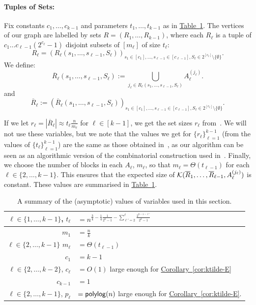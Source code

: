 \documentclass{article}
\newcommand{\cor}[1]{\hyperref[cor:#1]{Corollary~\ref*{cor:#1}}}
\newcommand{\tabl}[1]{\hyperref[tab:#1]{Table~\ref*{tab:#1}}}
\renewcommand{\>}{\rangle}
\newcommand{\<}{\langle}
\renewcommand{\(}{\left(}
\renewcommand{\)}{\right)}
\begin{document}
\paragraph{Tuples of Sets:} Fix constants $c_1,\dots,c_{k-1}$ and parameters $t_1,\dots,t_{k-1}$ as in \tabl{k-dist-setsizes}. The vertices of our graph are labelled by sets $R=(R_1,\dots,R_{k-1})$, where each $R_{\ell}$ is a tuple of $c_1\dots c_{\ell-1}(2^{c_{\ell}}-1)$ disjoint subsets of $[m_{\ell}]$ of size $t_\ell$:
$$R_{\ell}=(R_{\ell}(s_1,\dots,s_{\ell-1},S_{\ell}))_{s_1\in [c_1],\dots,s_{\ell-1}\in [c_{\ell-1}],S_{\ell}\in 2^{[c_{\ell}]}\setminus\{\emptyset\}}.$$
We define:
$$\overline{R}_{\ell}(s_1,\dots,s_{\ell-1},S_{\ell}):= 
\bigcup_{j_{\ell}\in R_{\ell}(s_1,\dots,s_{\ell-1},S_{\ell})}A_{\ell}^{(j_{\ell})}.$$
and
$$\overline{R}_{\ell}:=
(\overline{R}_{\ell}(s_1,\dots,s_{\ell-1},S_{\ell}))_{s_1\in [c_1],\dots,s_{\ell-1}\in [c_{\ell-1}],S_{\ell}\in 2^{[c_{\ell}]}\setminus\{\emptyset\}}.$$

If we let $r_{\ell}=|\overline{R}_{\ell}|\approx t_{\ell}\frac{n}{m_{\ell}}$ for $\ell\in [k-1]$, we get the set sizes $r_{\ell}$ from~\cite{belovs2012kDist}. We will not use these variables, but we note that the values we get for $\{r_{\ell}\}_{\ell=1}^{k-1}$ (from the values of $\{t_{\ell}\}_{\ell=1}^{k-1}$) are the same as those obtained in~\cite{belovs2012kDist}, as our algorithm can be seen as an algorithmic version of the combinatorial construction used in~\cite{belovs2012kDist}. Finally, we choose the number of blocks in each $A_{\ell}$, $m_{\ell}$, so that $m_{\ell}=\Theta(t_{\ell-1})$ for each $\ell\in \{2,\dots,k-1\}$. This ensures that the expected size of ${\cal K}(\overline{R}_1,\dots,\overline{R}_{\ell-1},A_{\ell}^{(j_{\ell})})$ is constant. These values are summarised in \tabl{k-dist-setsizes}.

\begin{table}
	\renewcommand{\arraystretch}{2}
	\centering
	\begin{tabular}{ |r|l|}
		\hline
		$\ell\in\{1,\dots,k-1\}$, $t_{\ell}$ & $=n^{\frac{3}{4}-\frac{1}{4}\frac{1}{2^k-1} - \sum_{\ell'=2}^{\ell}\frac{2^{k-1-\ell'}}{2^k-1}}$\\
		\hline
		$m_1$ & $=\frac{n}{k}$\\
		\hline
		$\ell\in\{2,\dots,k-1\}$ $m_{\ell}$ & $=\Theta(t_{\ell-1})$\\
		\hline
		$c_1$ & $=k-1$\\
		\hline
		$\ell\in\{2,\dots,k-2\}$, $c_{\ell}$ & $=O(1)$ large enough for \cor{ktilde-E}\\
		\hline
		$c_{k-1}$ & $=1$\\
		\hline
		$\ell\in\{2,\dots,k-1\}$, $p_{\ell}$ & $={\sf polylog}(n)$ large enough for \cor{ktilde-E}.\\
		\hline
	\end{tabular}
	\caption{A summary of the (asymptotic) values of variables used in this section.}\label{tab:k-dist-setsizes}
\end{table}
\end{document}
